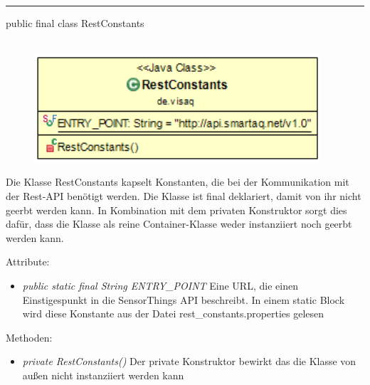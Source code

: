 \rule{\textwidth}{0.4pt}
public final class RestConstants
\\\\
\begin{minipage}{0.4\textwidth}
    \begin{figure}[H]
        {\centering\includegraphics[width=0.95\textwidth]{media/backend/modell/classes/RestConstants.png}}
    \end{figure}
    \end{minipage} \hfill
\begin{minipage}{0.6\textwidth}
    Die Klasse RestConstants kapselt Konstanten, die bei der Kommunikation mit der Rest-API benötigt werden.
    Die Klasse ist final deklariert, damit von ihr nicht geerbt werden kann.
    In Kombination mit dem privaten Konstruktor sorgt dies dafür, dass die Klasse als reine Container-Klasse weder instanziiert noch geerbt werden kann.
\end{minipage}

Attribute:
\begin{itemize}
    \item \emph{public static final String ENTRY\_POINT} Eine URL, die einen Einstigespunkt in die \gls{SensorThings API} beschreibt.
    In einem static Block wird diese Konstante aus der Datei rest\_constants.properties gelesen
\end{itemize}
Methoden:
\begin{itemize}
    \item \emph{private RestConstants()}
    Der private Konstruktor bewirkt das die Klasse von außen nicht instanziiert werden kann
\end{itemize}
